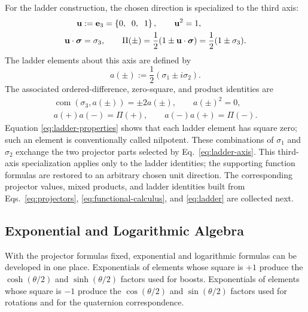 \documentclass[10pt,letterpaper]{article}
\newcommand{\eqfunc}[1]{\operatorname{#1}}
\newcommand{\pv}[1]{#1}
\newcommand{\vct}[1]{\mathbf{#1}}
\newcommand{\sigv}{\vct{\pv{\bm{\sigma}}}}
\newcommand{\vthree}[3]{%
  \left\{#1,\mkern10mu #2,\mkern10mu #3\right\}%
}
\newcommand{\com}[2]{\eqfunc{com}\!\left(#1,#2\right)}
\begin{document}
For the ladder construction, the chosen direction is specialized to the
third axis:
\begin{equation}
\begin{aligned}
\vct{u}&:=\vct{e}_3=\vthree{0}{0}{1},
\qquad
\vct{u}^2=1,
\\
\vct{u}\cdot\sigv&=\pv{\sigma}_3,
\qquad
\pv{\Pi}(\pm)
=\frac12(1\pm\vct{u}\cdot\sigv)
=\frac12(1\pm\pv{\sigma}_3).
\end{aligned}
\label{eq:ladder-axis}
\end{equation}
The ladder elements about this axis are defined by
\begin{equation}
\pv{a}(\pm):=\frac{1}{2}(\pv{\sigma}_1\pm i\pv{\sigma}_2).
\label{eq:ladder}
\end{equation}
The associated ordered-difference, zero-square, and product identities are
\begin{equation}
\begin{gathered}
\com{\pv{\sigma}_3}{\pv{a}(\pm)}=\pm 2\pv{a}(\pm),\qquad
\pv{a}(\pm)^2=0,\\
\pv{a}(+)\pv{a}(-)=\pv{\Pi}(+),\qquad
\pv{a}(-)\pv{a}(+)=\pv{\Pi}(-).
\end{gathered}
\label{eq:ladder-properties}
\end{equation}
Equation \eqref{eq:ladder-properties} shows that each ladder element has
square zero; such an element is conventionally called nilpotent. These
combinations of \(\pv{\sigma}_1\) and \(\pv{\sigma}_2\) exchange the two
projector parts selected by Eq.\ \eqref{eq:ladder-axis}. This third-axis
specialization applies only to the ladder identities; the supporting
function formulas are restored to an arbitrary chosen unit direction. The corresponding
projector values, mixed products, and ladder identities built from Eqs.\
\eqref{eq:projectors}, \eqref{eq:functional-calculus}, and
\eqref{eq:ladder} are collected next.


\subsection{Exponential and Logarithmic Algebra}
With the projector formulas fixed, exponential and logarithmic formulas can
be developed in one place. Exponentials of elements whose square is \(+1\)
produce the \(\cosh(\theta/2)\) and \(\sinh(\theta/2)\) factors used for
boosts. Exponentials of elements whose square is \(-1\) produce the
\(\cos(\theta/2)\) and \(\sin(\theta/2)\) factors used for rotations and for
the quaternion correspondence.

\end{document}
